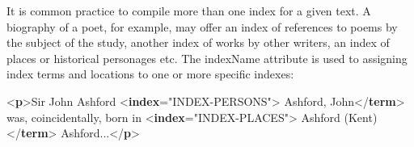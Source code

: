 It is common practice to compile more than one index for a given text. A biography of a poet, for example, may offer an index of references to poems by the subject of the study, another index of works by other writers, an index of places or historical personages etc. The indexName attribute is used to assigning index terms and locations to one or more specific indexes: \par\bgroup{}\exampleFont \begin{shaded}\noindent\mbox{}{<\textbf{p}>}Sir John Ashford\mbox{}\newline 
{<\textbf{index}\hspace*{1em}{indexName}="{INDEX-PERSONS}">}\mbox{}\newline 
\hspace*{1em}Ashford, John{</\textbf{term}>}\mbox{}\newline 
{} was,\mbox{}\newline 
 coincidentally, born in\mbox{}\newline 
{<\textbf{index}\hspace*{1em}{indexName}="{INDEX-PLACES}">}\mbox{}\newline 
\hspace*{1em}Ashford\mbox{}\newline 
\hspace*{1em}\hspace*{1em}\hspace*{1em}\hspace*{1em} (Kent){</\textbf{term}>}\mbox{}\newline 
{}Ashford...{</\textbf{p}>}\end{shaded}\egroup\par \par
